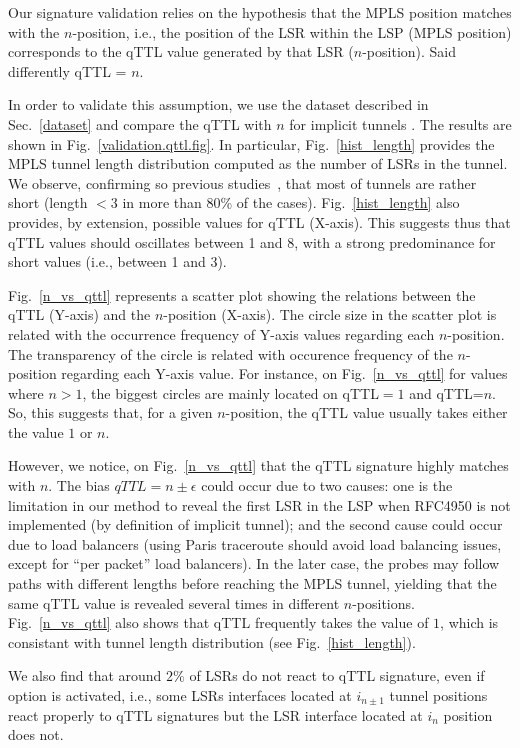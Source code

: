 Our signature validation relies on the hypothesis that the MPLS position matches
with the $n$-position, i.e., the position of the LSR within the LSP (MPLS
position) corresponds to the qTTL value generated by that LSR ($n$-position). 
Said differently qTTL = $n$.

In order to validate this assumption, we use the dataset described in
Sec.~\ref{dataset} and compare the qTTL with $n$ for implicit tunnels
. The results are shown in Fig.~\ref{validation.qttl.fig}.  In
particular, Fig.~\ref{hist_length} provides the MPLS tunnel length distribution
computed as the number of LSRs in the tunnel.  We observe, confirming so
previous studies~\cite{SOM11,Vanaubel15,Donnet12}, that most of tunnels are
rather short (length $< 3$ in more than 80\% of the cases). 
Fig.~\ref{hist_length} also provides, by extension, possible values for qTTL
(X-axis).  This suggests thus that qTTL values should oscillates between 1 and
8, with a strong predominance for short values (i.e., between 1 and 3).

Fig.~\ref{n_vs_qttl} represents a scatter plot showing the relations between the
qTTL (Y-axis) and the $n$-position (X-axis).  The circle size in the scatter
plot is related with the occurrence frequency of Y-axis values regarding each
$n$-position.  The transparency of the circle is related with occurence
frequency of the $n$-position regarding each Y-axis value.  For instance, on
Fig.~\ref{n_vs_qttl} for values where $n>1$, the biggest circles are mainly
located on qTTL$=1$ and qTTL=$n$.  So, this suggests that, for a given
$n$-position, the qTTL value usually takes either the value $1$ or $n$.

However, we notice, on Fig.~\ref{n_vs_qttl} that the qTTL signature highly
matches with $n$.   The bias $\textit{qTTL}=n \pm \epsilon$ could occur due to
two causes: one is the limitation in our method to reveal the first LSR in the
LSP when RFC4950 is not implemented (by definition of implicit tunnel); and the
second cause could occur due to load balancers (using Paris traceroute should
avoid load balancing issues, except for ``per packet'' load balancers).
In the later case, the \traceroute probes may follow paths with different
lengths before reaching the MPLS tunnel, yielding that the same qTTL value is
revealed several times in different $n$-positions. Fig.~\ref{n_vs_qttl} also
shows that qTTL frequently takes the value of $1$, which is consistant with
tunnel length distribution (see Fig.~\ref{hist_length}).  

We also find that around $2\%$ of LSRs do not react to qTTL signature, even
if \tpropagate option is activated, i.e., some LSRs interfaces located at
$i_{n \pm 1}$ tunnel positions react properly to qTTL signatures but the LSR
interface located at $i_n$ position does not.

